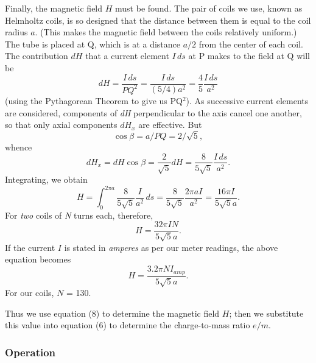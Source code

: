 
Finally, the magnetic field $H$ must be found. The pair of coils we
use, known as Helmholtz coils, is so designed that the distance between
them is equal to the coil radius $a$. (This makes the magnetic field
between the coils relatively uniform.) The tube is placed at Q,
which is at a distance $a/2$ from the center of each coil. The
contribution $dH$ that a current element $I\,ds$ at P makes to
the field at Q will be
\begin{equation*}
dH = \frac{I\,ds}{PQ^2} = \frac{I\,ds}{(5/4)a^2} = \frac{4}{5}\frac{I\,ds}{a^2}
\end{equation*}
(using the Pythagorean Theorem to give us PQ$^2$). As
successive current elements are considered, components of \emph{dH}
per\-pen\-dic\-u\-lar to the axis cancel one another, so that only axial
components $dH_x$ are effective. But
\begin{equation*}
\cos{\beta} = a/PQ = 2/\sqrt{5},
\end{equation*}
whence
\begin{equation}\tag{7}
dH_x = dH \cos{\beta} = \frac{2}{\sqrt{5}}dH = \frac{8}{5\sqrt{5}}\frac{I\,ds}{a^2}.
\end{equation}
Integrating, we obtain
\begin{equation*}
H = \int_{0}^{2\pi{a}} \frac{8}{5\sqrt{5}}\frac{I}{a^2}\,ds = \frac{8}{5\sqrt{5}}\frac{2\pi aI}{a^2} = \frac{16\pi I}{5\sqrt{5}a}.
\end{equation*}
For \emph{two} coils of \emph{N} turns each, therefore,
\begin{equation*}
H = \frac{32\pi IN}{5\sqrt{5}a}.
\end{equation*}
If the current $I$ is stated in \emph{amperes} as per our meter
readings, the above equation becomes
\begin{equation}\tag{8}
H = \frac{3.2\pi NI_{amp}}{5\sqrt{5}a}.
\end{equation}
For our coils, $N$ = 130.

Thus we use equation (8) to determine the magnetic field $H$; then
we substitute this value into equation (6) to determine the
charge-to-mass ratio $e/m$.

\subsubsection*{Operation}

